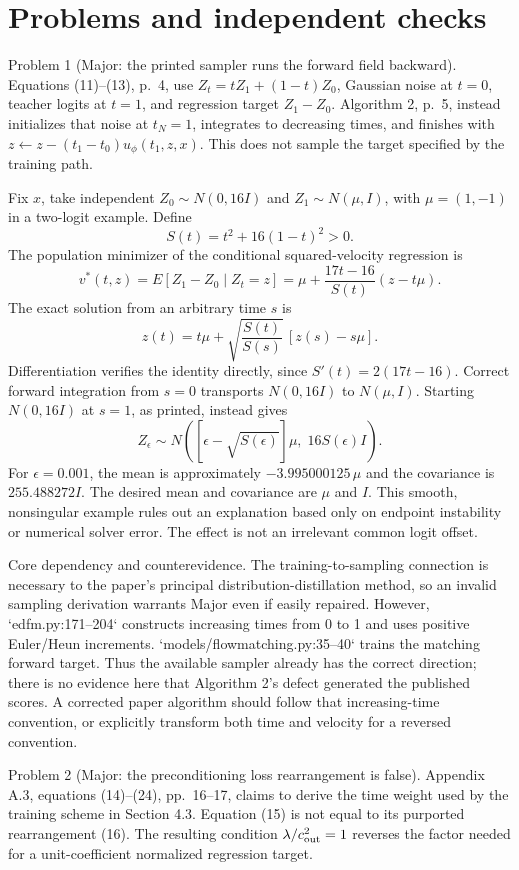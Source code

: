 \documentclass[10pt]{article}
\begin{document}
\section*{Problems and independent checks}
Problem 1 (Major: the printed sampler runs the forward field backward).  Equations (11)–(13), p. 4, use \(Z_t=tZ_1+(1-t)Z_0\), Gaussian noise at \(t=0\), teacher logits at \(t=1\), and regression target \(Z_1-Z_0\). Algorithm 2, p. 5, instead initializes that noise at \(t_N=1\), integrates to decreasing times, and finishes with \(z\leftarrow z-(t_1-t_0)u_\phi(t_1,z,x)\). This does not sample the target specified by the training path.\par
Fix \(x\), take independent \(Z_0\sim N(0,16I)\) and \(Z_1\sim N(\mu,I)\), with \(\mu=(1,-1)\) in a two-logit example. Define \[S(t)=t^2+16(1-t)^2>0.\] The population minimizer of the conditional squared-velocity regression is \[v^*(t,z)=E[Z_1-Z_0\mid Z_t=z]
 =\mu+\frac{17t-16}{S(t)}(z-t\mu).\] The exact solution from an arbitrary time \(s\) is \[z(t)=t\mu+\sqrt{\frac{S(t)}{S(s)}}\,[z(s)-s\mu].\] Differentiation verifies the identity directly, since \(S'(t)=2(17t-16)\). Correct forward integration from \(s=0\) transports \(N(0,16I)\) to \(N(\mu,I)\). Starting \(N(0,16I)\) at \(s=1\), as printed, instead gives \[Z_\epsilon\sim N\!\left(
 [\epsilon-\sqrt{S(\epsilon)}]\mu,\;16S(\epsilon)I\right).\] For \(\epsilon=0.001\), the mean is approximately \(-3.995000125\,\mu\) and the covariance is \(255.488272I\). The desired mean and covariance are \(\mu\) and \(I\). This smooth, nonsingular example rules out an explanation based only on endpoint instability or numerical solver error. The effect is not an irrelevant common logit offset.\par
Core dependency and counterevidence. The training-to-sampling connection is necessary to the paper’s principal distribution-distillation method, so an invalid sampling derivation warrants Major even if easily repaired. However, `edfm.py:171--204` constructs increasing times from 0 to 1 and uses positive Euler/Heun increments. `models/flowmatching.py:35--40` trains the matching forward target. Thus the available sampler already has the correct direction; there is no evidence here that Algorithm 2’s defect generated the published scores. A corrected paper algorithm should follow that increasing-time convention, or explicitly transform both time and velocity for a reversed convention.\par
Problem 2 (Major: the preconditioning loss rearrangement is false).  Appendix A.3, equations (14)–(24), pp. 16–17, claims to derive the time weight used by the training scheme in Section 4.3. Equation (15) is not equal to its purported rearrangement (16). The resulting condition \(\lambda/c_{\rm out}^2=1\) reverses the factor needed for a unit-coefficient normalized regression target.\par
\end{document}
